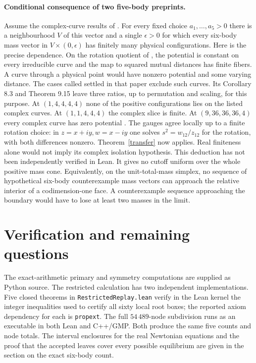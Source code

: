 \documentclass[11pt]{article}
\begin{document}
\paragraph{Conditional consequence of two five-body preprints.}
Assume the complex-curve results of \cite{tomfive,tomspecial}. For every fixed choice $a_1,\ldots,a_5>0$ there is a neighbourhood $V$ of this vector and a single $\epsilon>0$ for which every six-body mass vector in $V\times(0,\epsilon)$ has finitely many physical configurations. Here is the precise dependence. On the rotation quotient of \cite[Lemmas 2.2 and 2.4, Corollary 2.5]{tomfive}, the potential is constant on every irreducible curve and the map to squared mutual distances has finite fibers. A curve through a physical point would have nonzero potential and some varying distance. The cases called settled in that paper exclude such curves. Its Corollary 8.3 and Theorem 9.15 leave three ratios, up to permutation and scaling, for this purpose. At $(1,4,4,4,4)$ none of the positive configurations lies on the listed complex curves. At $(1,1,4,4,4)$ the complex slice is finite. At $(9,36,36,36,4)$ every complex curve has zero potential \cite[Theorems 1.1--1.3]{tomspecial}. The gauges agree locally up to a finite rotation choice: in $z=x+iy,w=x-iy$ one solves $s^2=w_{12}/z_{12}$ for the rotation, with both differences nonzero. Theorem~\ref{transfer} now applies. Real finiteness alone would not imply its complex isolation hypothesis. This deduction has not been independently verified in Lean. It gives no cutoff uniform over the whole positive mass cone. Equivalently, on the unit-total-mass simplex, no sequence of hypothetical six-body counterexample mass vectors can approach the relative interior of a codimension-one face. A counterexample sequence approaching the boundary would have to lose at least two masses in the limit.

\section{Verification and remaining questions}
The exact-arithmetic primary and symmetry computations are supplied as Python source. The restricted calculation has two independent implementations. Five closed theorems in \texttt{RestrictedReplay.lean} verify in the Lean kernel the integer inequalities used to certify all sixty local root boxes; the reported axiom dependency for each is \texttt{propext}. The full $54\,489$-node subdivision runs as an executable in both Lean and C++/GMP. Both produce the same five counts and node totals. The interval enclosures for the real Newtonian equations and the proof that the accepted leaves cover every possible equilibrium are given in the section on the exact six-body count.
\end{document}
